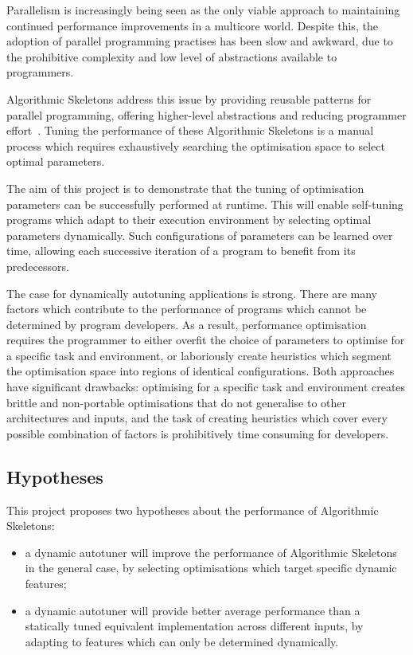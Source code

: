 Parallelism is increasingly being seen as the only viable approach to
maintaining continued performance improvements in a multicore
world. Despite this, the adoption of parallel programming practises
has been slow and awkward, due to the prohibitive complexity and low
level of abstractions available to programmers.

Algorithmic Skeletons address this issue by providing reusable
patterns for parallel programming, offering higher-level abstractions
and reducing programmer effort~\cite{Cole1989, Cole2004}. Tuning the
performance of these Algorithmic Skeletons is a manual process which
requires exhaustively searching the optimisation space to select
optimal parameters.

The aim of this project is to demonstrate that the tuning of
optimisation parameters can be successfully performed at runtime. This
will enable self-tuning programs which adapt to their execution
environment by selecting optimal parameters dynamically. Such
configurations of parameters can be learned over time, allowing each
successive iteration of a program to benefit from its predecessors.

The case for dynamically autotuning applications is strong. There are
many factors which contribute to the performance of programs which
cannot be determined by program developers.
As a result, performance optimisation requires the programmer to
either overfit the choice of parameters to optimise for a specific
task and environment, or laboriously create heuristics which segment
the optimisation space into regions of identical configurations. Both
approaches have significant drawbacks: optimising for a specific task
and environment creates brittle and non-portable optimisations that do
not generalise to other architectures and inputs, and the task of
creating heuristics which cover every possible combination of factors
is prohibitively time consuming for developers.

\subsection{Hypotheses}
This project proposes two hypotheses about the performance of
Algorithmic Skeletons:
\begin{itemize}
\item a dynamic autotuner will improve the performance of Algorithmic
  Skeletons in the general case, by selecting optimisations which
  target specific dynamic features;
\item a dynamic autotuner will provide better average performance than
  a statically tuned equivalent implementation across different
  inputs, by adapting to features which can only be determined
  dynamically.
\end{itemize}

